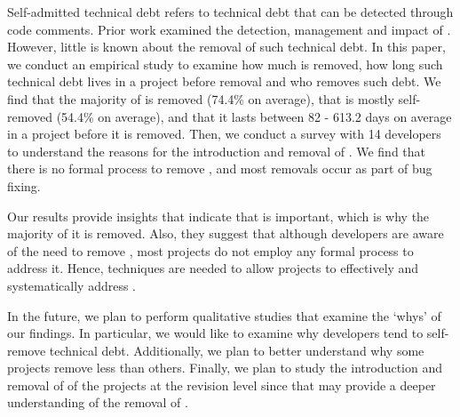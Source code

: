 Self-admitted technical debt refers to technical debt that can be detected through code comments. Prior work examined the detection, management and impact of \SATD. However, little is known about the removal of such technical debt. In this paper, we conduct an empirical study to examine how much \SATD is removed, how long such technical debt lives in a project before removal and who removes such debt. We find that the majority of \SATD is removed (74.4\% on average), that \SATD is mostly self-removed (54.4\% on average), and that it lasts between 82 - 613.2 days on average in a project before it is removed. Then, we conduct a survey with 14 developers to understand the reasons for the introduction and removal of \SATD. We find that there is no formal process to remove \SATD, and most removals occur as part of bug fixing.

Our results provide insights that indicate that \SATD is important, which is why the majority of it is removed. Also, they suggest that although developers are aware of the need to remove \SATD, most projects do not employ any formal process to address it. Hence, techniques are needed to allow projects to effectively and systematically address \SATD.

In the future, we plan to perform qualitative studies that examine the `whys' of our findings. In particular, we would like to examine why developers tend to self-remove technical debt. Additionally, we plan to better understand why some projects remove less \SATD than others. Finally, we plan to study the introduction and removal of \SATD of the projects at the revision level since that may provide a deeper understanding of the removal of \SATD.

